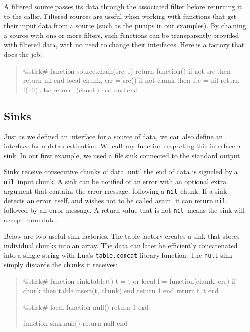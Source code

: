 \documentclass[10pt]{article}
\newcommand{\nil}{\texttt{nil}}
\begin{document}
			A filtered source passes its data through the
			associated filter before returning it to the caller. 
			Filtered sources are useful when working with
			functions that get their input data from a source (such as
			the pumps in our examples). By chaining a source with one or
			more filters, such functions can be transparently provided
			with filtered data, with no need to change their interfaces. 
			Here is a factory that does the job:
			\begin{quote}
			\begin{lua}
			@stick#
			function source.chain(src, f)
            return function()
        if not src then 
        return nil 
        end
        local chunk, err = src()
        if not chunk then 
        src = nil
        return f(nil)
        else 
        return f(chunk) 
        end
            end
			end
			\end{lua}
			\end{quote}
			
			\subsection{Sinks}
			
			Just as we defined an interface for a source of data, we can
			also define an interface for a data destination.  We call
			any function respecting this interface a sink. In our first
			example, we used a file sink connected to the standard
			output. 
			
			Sinks receive consecutive chunks of data, until the end of
			data is signaled by a \nil\ input chunk. A sink can be
			notified of an error with an optional extra argument that
			contains the error message, following a \nil\ chunk.  
			If a sink detects an error itself, and
			wishes not to be called again, it can return \nil,
			followed by an error message. A return value that
			is not \nil\ means the sink will accept more data.
			
			Below are two useful sink factories. 
			The table factory creates a sink that stores
			individual chunks into an array. The data can later be
			efficiently concatenated into a single string with Lua's
			\texttt{table.concat} library function. The \texttt{null} sink 
			simply discards the chunks it receives:
			\begin{quote}
			\begin{lua}
			@stick#
			function sink.table(t)
            t = t or {}
            local f = function(chunk, err)
        if chunk then table.insert(t, chunk) end
        return 1
            end
            return f, t
			end
			
			@stick#
			local function null()
            return 1
			end
			
			function sink.null()
            return null
			end
			\end{lua}
			\end{quote}
			
\end{document}
